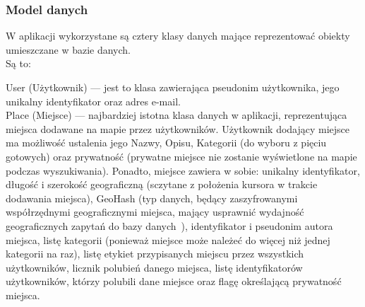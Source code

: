 \newpage
		\subsubsection{Model danych}
		W aplikacji wykorzystane są cztery klasy danych mające reprezentować obiekty umieszczane w bazie danych. \\
		Są to: 

		\noindent \newline User (Użytkownik) — jest to klasa zawierająca pseudonim użytkownika, jego unikalny identyfikator oraz adres e-mail. \\
		
		\noindent \newline Place (Miejsce) — najbardziej istotna klasa danych w aplikacji, reprezentująca miejsca dodawane na mapie przez użytkowników. Użytkownik dodający miejsce ma możliwość ustalenia
		jego Nazwy, Opisu, Kategorii (do wyboru z pięciu gotowych) oraz prywatność (prywatne miejsce nie zostanie wyświetlone na mapie podczas wyszukiwania). Ponadto, miejsce zawiera w sobie:
		unikalny identyfikator, długość i szerokość geograficzną (sczytane z położenia kursora w trakcie dodawania miejsca), GeoHash (typ danych, będący zaszyfrowanymi współrzędnymi geograficznymi miejsca, 
		mający usprawnić wydajność geograficznych zapytań do bazy danych~\cite{GEOHASH}), identyfikator i pseudonim autora miejsca, listę kategorii (ponieważ miejsce może należeć do więcej niż jednej 
		kategorii na raz), listę etykiet przypisanych miejscu przez wszystkich użytkowników, licznik polubień danego miejsca, listę identyfikatorów użytkowników, którzy polubili dane miejsce oraz flagę 
		określającą prywatność miejsca. 
		
